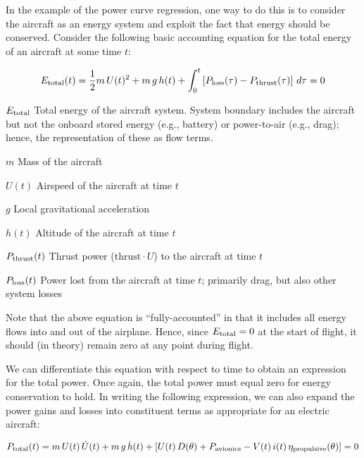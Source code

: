 \documentclass[conf]{new-aiaa}
\begin{document}
    In the example of the power curve regression, one way to do this is to consider the aircraft as an energy system and exploit the fact that energy should be conserved. Consider the following basic accounting equation for the total energy of an aircraft at some time $t$:

    \begin{equation}
        E_{\rm total}(t) =
        \frac{1}{2}m \, U(t)^2
        + m \, g \, h(t)
        + \int_0^t \left[
            P_{\rm loss}(\tau)
            - P_{\rm thrust}(\tau)
            \right] \, d\tau = 0
        \label{eq:total_energy}
    \end{equation}

    \begin{eqexpl}
        \item{$E_{\rm total}$} Total energy of the aircraft system. System boundary includes the aircraft but not the onboard stored energy (e.g., battery) or power-to-air (e.g., drag); hence, the representation of these as flow terms.
        \item{$m$} Mass of the aircraft
        \item{$U(t)$} Airspeed of the aircraft at time $t$
        \item{$g$} Local gravitational acceleration
        \item{$h(t)$} Altitude of the aircraft at time $t$
        \item{$P_{\rm thrust}(t)$} Thrust power ($\text{thrust} \cdot U$) to the aircraft at time $t$
        \item{$P_{\rm loss}(t)$} Power lost from the aircraft at time $t$; primarily drag, but also other system losses
    \end{eqexpl}

    \noindent Note that the above equation is ``fully-accounted'' in that it includes all energy flows into and out of the airplane. Hence, since $E_{\rm total} = 0$ at the start of flight, it should (in theory) remain zero at any point during flight.

    We can differentiate this equation with respect to time to obtain an expression for the total power. Once again, the total power must equal zero for energy conservation to hold. In writing the following expression, we can also expand the power gains and losses into constituent terms as appropriate for an electric aircraft:

    \begin{equation}
        P_{\rm total}(t) =
        m \, U(t) \, \dot{U}(t)
        + m \, g \, \dot{h}(t)
        + \left[
            U(t) \, D(\theta)
            + P_{\rm avionics}
            - V(t) \, i(t) \, \eta_{\rm propulsive}(\theta)
            \right] = 0
        \label{eq:total_power}
    \end{equation}
\end{document}
